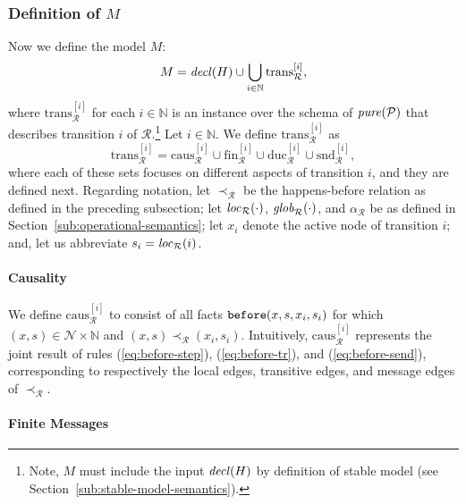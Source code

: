 \documentclass{tlp}
\newcommand{\Nat}{\mathbb{N}}  \newcommand{\len}[1]{|#1|} \newcommand{\rom}[1]{\text{\emph{(#1)}}} \newcommand{\romI}{\rom i}
\newcommand{\ded}{\mathcal{P}}
\newcommand{\nw}{\mathcal{N}}
\newcommand{\before}{\pred{before}}
\newcommand{\decl}[1]{\fname{decl}(#1)}
\newcommand{\pure}[1]{\fname{pure}(#1)}
\newcommand{\run}{\mathcal{R}}
\newcommand{\locR}[1]{\fname{loc}_{\run}(#1)}
\newcommand{\globR}[1]{\fname{glob}_{\run}(#1)}
\newcommand{\nwnat}{\nw\times\Nat}
\newcommand{\arr}{\alpha_{\run}}
\newcommand{\slice}[1]{\mathrm{trans}_{\run}^{[#1]}}
\newcommand{\slicefin}[1]{\text{fin}_{\run}^{[#1]}}
\newcommand{\sliceduc}[1]{\text{duc}_{\run}^{[#1]}}
\newcommand{\slicesnd}[1]{\text{snd}_{\run}^{[#1]}}
\newcommand{\slicecaus}[1]{\text{caus}_{\run}^{[#1]}}
\newcommand{\caus}{\prec_{\run}}
\begin{document}
\subsubsection{Definition of $M$}

\label{sub:run-to-model-construction}

Now we define the model $M$: 
\[
M=\decl H\cup\bigcup_{i\in\Nat}\slice i,
\]
where $\slice i$ for each $i\in\Nat$ is an instance over the schema
of $\pure{\ded}$ that describes transition $i$ of $\run$.\footnote{Note, $M$ must include the input $\decl H$ by definition of stable
model (see Section~\ref{sub:stable-model-semantics}).} Let $i\in\Nat$. We define $\slice i$ as
\[
\slice i=\slicecaus i\cup\slicefin i\cup\sliceduc i\cup\slicesnd i,
\]
where each of these sets focuses on different aspects of transition
$i$, and they are defined next. Regarding notation, let $\caus$
be the happens-before relation as defined in the preceding subsection;
let $\locR{\cdot}$, $\globR{\cdot}$, and $\arr$ be as defined in
Section~\ref{sub:operational-semantics}; let $x_{i}$ denote the
active node of transition $i$; and, let us abbreviate $s_{i}=\locR i$. 




\paragraph*{Causality}

We define $\slicecaus i$ to consist of all facts $\before(x,s,x_{i},s_{i})$
for which $(x,s)\in\nwnat$ and $(x,s)\caus(x_{i},s_{i})$. Intuitively,
$\slicecaus i$ represents the joint result of rules (\ref{eq:before-step}),
(\ref{eq:before-tr}), and (\ref{eq:before-send}), corresponding
to respectively the local edges, transitive edges, and message edges
of $\caus$.




\paragraph*{Finite Messages}
\end{document}
